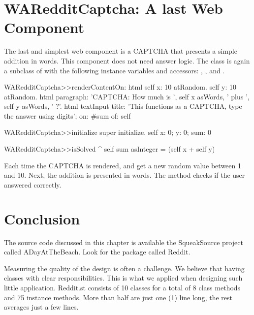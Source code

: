 \documentclass[a4paper,10pt,twoside]{book}
\begin{document}
\section{WARedditCaptcha: A last Web Component}

The last and simplest web component is a CAPTCHA that presents a simple addition in words. This component does not need answer logic. The class  is again a subclass of  with the following instance variables and accessors: , , and .


\begin{code}{}
WARedditCaptcha>>renderContentOn: html
	self x: 10 atRandom. 
	self y: 10 atRandom. 
	html paragraph: 'CAPTCHA: How much is ', 
		self x asWords, ' plus ', self y asWords, ' ?'. 
	html textInput 
		title: 'This functions as a CAPTCHA, type the answer using digits'; 
		on: #sum of: self
\end{code}

\begin{code}{}
WARedditCaptcha>>initialize
	super initialize. 
	self x: 0; y: 0; sum: 0
\end{code}

\begin{code}{}
WARedditCaptcha>>isSolved
	^ self sum asInteger = (self x + self y)
\end{code}

Each time the CAPTCHA is rendered,  and  get a new random value between 1 and 10. Next, the addition is presented in words. The  method checks if the user answered correctly.

\section{Conclusion}

The source code discussed in this chapter is available the SqueakSource project called ADayAtTheBeach. Look for the package called Reddit.

Measuring the quality of the design is often a challenge. We believe that having classes with clear responsibilities. This is what we applied when designing such little application. Reddit.st consists of 10 classes for a total of 8 class methods and 75 instance methods. More than half are just one (1) line long, the rest averages just a few lines.



\ifx\wholebook\relax\else
    
    
\end{document}
